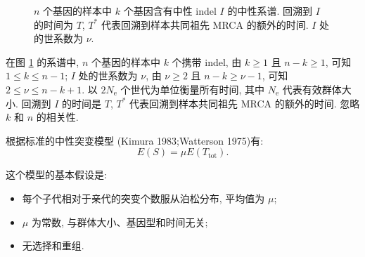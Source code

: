 \documentclass[12pt]{article}
\begin{document}
\begin{figure}
    \caption{
            $n$ 个基因的样本中 $k$ 个基因含有中性 indel $I$ 的中性系谱.
            回溯到 $I$ 的时间为 $T$, $T^*$ 代表回溯到样本共同祖先 MRCA 的额外的时间.
            $I$ 处的世系数为 $\nu$.
        }
    \label{fig:1}
\end{figure}

在图 \ref{fig:1} 的系谱中, $n$ 个基因的样本中 $k$ 个携带 indel,
由 $k \geq 1$ 且 $n-k \geq 1$, 可知 $1 \leq k \leq n-1$;
$I$ 处的世系数为 $\nu$, 由 $\nu \geq 2$ 且 $n-k \geq \nu - 1$, 可知 $2 \leq \nu \leq n-k+1$.
以 $2N_\text{e}$ 个世代为单位衡量所有时间, 其中 $N_\text{e}$ 代表有效群体大小.
回溯到 $I$ 的时间是 $T$, $T^*$ 代表回溯到样本共同祖先 MRCA 的额外的时间.
忽略 $k$ 和 $n$ 的相关性.

根据标准的中性突变模型 (Kimura 1983;Watterson 1975)有:
\begin{equation} \label{eq:1}
    E(S) = \mu E(T_{\text{tot}})
    \text{.}
\end{equation}

这个模型的基本假设是:
\begin{itemize}[leftmargin=4em]
    \item 每个子代相对于亲代的突变个数服从泊松分布, 平均值为 $\mu$;
    \item $\mu$ 为常数, 与群体大小、基因型和时间无关;
    \item 无选择和重组.
\end{itemize}
\end{document}
